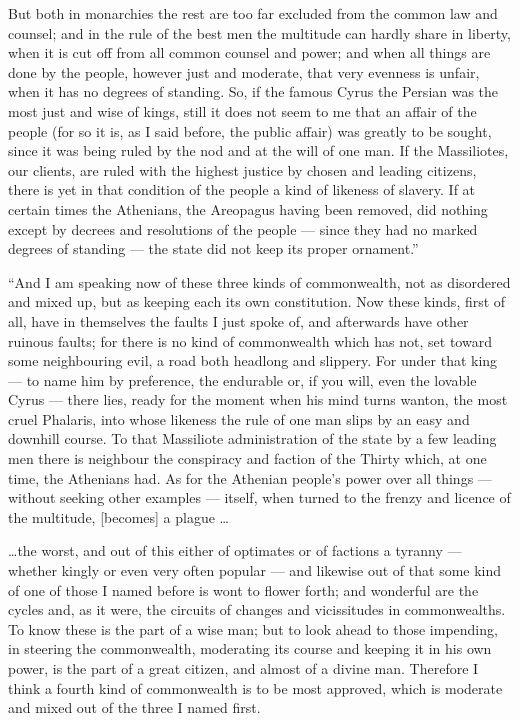  But both in monarchies the rest are too far excluded from the common law and counsel; and in the rule of the best men the multitude can hardly share in liberty, when it is cut off from all common counsel and power; and when all things are done by the people, however just and moderate, that very evenness is unfair, when it has no degrees of standing. So, if the famous Cyrus the Persian was the most just and wise of kings, still it does not seem to me that an affair of the people (for so it is, as I said before, the public affair) was greatly to be sought, since it was being ruled by the nod and at the will of one man. If the Massiliotes, our clients, are ruled with the highest justice by chosen and leading citizens, there is yet in that condition of the people a kind of likeness of slavery. If at certain times the Athenians, the Areopagus having been removed, did nothing except by decrees and resolutions of the people --- since they had no marked degrees of standing --- the state did not keep its proper ornament.''

 ``And I am speaking now of these three kinds of commonwealth, not as disordered and mixed up, but as keeping each its own constitution. Now these kinds, first of all, have in themselves the faults I just spoke of, and afterwards have other ruinous faults; for there is no kind of commonwealth which has not, set toward some neighbouring evil, a road both headlong and slippery. For under that king --- to name him by preference, the endurable or, if you will, even the lovable Cyrus --- there lies, ready for the moment when his mind turns wanton, the most cruel Phalaris, into whose likeness the rule of one man slips by an easy and downhill course. To that Massiliote administration of the state by a few leading men there is neighbour the conspiracy and faction of the Thirty which, at one time, the Athenians had. As for the Athenian people's power over all things --- without seeking other examples --- itself, when turned to the frenzy and licence of the multitude, [becomes] a plague \ldots

 \ldots the worst, and out of this either of optimates or of factions a tyranny --- whether kingly or even very often popular --- and likewise out of that some kind of one of those I named before is wont to flower forth; and wonderful are the cycles and, as it were, the circuits of changes and vicissitudes in commonwealths. To know these is the part of a wise man; but to look ahead to those impending, in steering the commonwealth, moderating its course and keeping it in his own power, is the part of a great citizen, and almost of a divine man. Therefore I think a fourth kind of commonwealth is to be most approved, which is moderate and mixed out of the three I named first.

